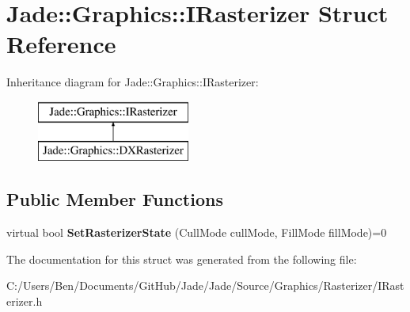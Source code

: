 \hypertarget{struct_jade_1_1_graphics_1_1_i_rasterizer}{}\section{Jade\+:\+:Graphics\+:\+:I\+Rasterizer Struct Reference}
\label{struct_jade_1_1_graphics_1_1_i_rasterizer}
Inheritance diagram for Jade\+:\+:Graphics\+:\+:I\+Rasterizer\+:\begin{figure}[H]
\begin{center}
\leavevmode
\includegraphics[height=2.000000cm]{struct_jade_1_1_graphics_1_1_i_rasterizer}
\end{center}
\end{figure}
\subsection*{Public Member Functions}
\begin{DoxyCompactItemize}
\item 
\hypertarget{struct_jade_1_1_graphics_1_1_i_rasterizer_a4063c858e345ceaca3ce995af411c4d0}{}virtual bool {\bfseries Set\+Rasterizer\+State} (Cull\+Mode cull\+Mode, Fill\+Mode fill\+Mode)=0\label{struct_jade_1_1_graphics_1_1_i_rasterizer_a4063c858e345ceaca3ce995af411c4d0}

\end{DoxyCompactItemize}


The documentation for this struct was generated from the following file\+:\begin{DoxyCompactItemize}
\item 
C\+:/\+Users/\+Ben/\+Documents/\+Git\+Hub/\+Jade/\+Jade/\+Source/\+Graphics/\+Rasterizer/I\+Rasterizer.\+h\end{DoxyCompactItemize}
